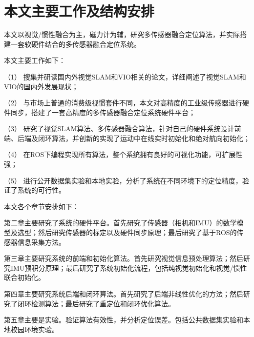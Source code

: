 \section{本文主要工作及结构安排}

本文以视觉/惯性融合为主，磁力计为辅，研究多传感器融合定位算法，并实际搭建一套软硬件结合的多传感器融合定位系统。

本文主要工作如下：

（1）	搜集并研读国内外视觉SLAM和VIO相关的论文，详细阐述了视觉SLAM和VIO的国内外发展现状；

（2）	与市场上普通的消费级视惯套件不同，本文对高精度的工业级传感器进行硬件同步，搭建了一套高精度的多传感器融合定位系统硬件平台；

（3）	研究了视觉SLAM算法、多传感器融合算法，针对自己的硬件系统设计前端、后端及闭环算法，并创新的实现了运动中在线实时初始化和绝对航向初始化；

（4）	在ROS下编程实现所有算法，整个系统拥有良好的可视化功能，可扩展性强；

（5） 进行公开数据集实验和本地实验，分析了系统在不同环境下的定位精度，验证了系统的可行性。

本文各个章节安排如下：

第二章主要研究了系统的硬件平台。首先研究了传感器（相机和IMU）的数学模型及选型；然后研究传感器的标定以及硬件同步原理；最后研究了基于ROS的传感器信息采集方法。

第三章主要研究系统的前端和初始化算法。首先研究视觉信息预处理算法；然后研究IMU预积分原理；最后研究了系统初始化流程，包括纯视觉初始化和视觉/惯性联合初始化。

第四章主要研究系统后端和闭环算法。首先研究了后端非线性优化的方法；然后研究了闭环检测算法；最后研究了重定位和闭环优化算法。

第五章主要是实验。验证算法有效性，并分析定位误差。包括公共数据集实验和本地校园环境实验。

